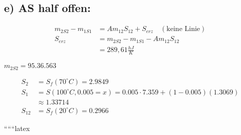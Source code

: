 \subsection*{e) AS half offen:}

\begin{align*}
    m_{2S2} - m_{1S1} &= Am_{12}S_{12} + S_{erz} \quad (\text{keine Linie}) \\
    S_{erz} &= m_{2S2} - m_{1S1} - Am_{12}S_{12} \\
    &= 289,61 \frac{hJ}{K}
\end{align*}

\noindent
$m_{2S2} = 95.36.563$

\begin{align*}
    S_2 &= S_f(70^\circ C) = 2.9849 \\
    S_1 &= S(100^\circ C, 0.005 = x) = 0.005 \cdot 7.359 + (1 - 0.005)(1.3069) \\
    &\approx 1.33714 \\
    S_{12} &= S_f(20^\circ C) = 0.2966
\end{align*}

``````latex